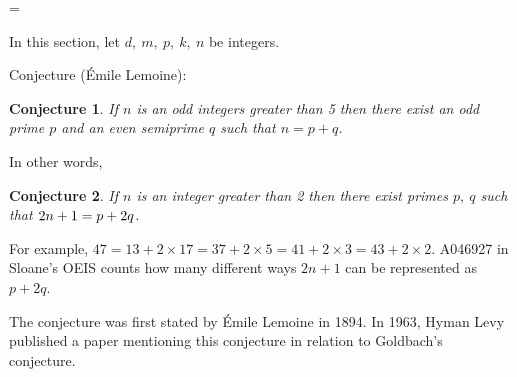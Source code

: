 \documentclass[12pt]{article}
\newtheorem{conjecture}{Conjecture}
\begin{document}
\parskip =\baselineskip
	
	
\begin{cnl}
		
		
\bigskip
		

		
In this section, let $d,\ m,\ p,\ k,\ n$ be integers.
		
		






\begin{remark}
Conjecture (\'Emile Lemoine): 
\end{remark}

\begin{conjecture}
If $n$ is an odd integers greater than 5 then there exist 
an odd prime $p$ and an even semiprime $q$ such that $n=p+q$. 
\end{conjecture}

\begin{remark}
In other words, 
\end{remark}

\begin{conjecture}
If $n$ is an integer greater than 2 then there exist primes 
$p,\ q$ such that $2\*n + 1 = p + 2\*q$. 
\end{conjecture}

\begin{remark}

For example, $47 = 13 + 2 \times 17 = 37 + 2 \times 5 = 
41 + 2 \times 3 = 43 + 2 \times 2$. A046927 in Sloane's OEIS counts
how many different ways $2n + 1$ can be represented as $p + 2q$.

The conjecture was first stated by \'Emile Lemoine in 1894. In 1963, 
Hyman Levy published a paper mentioning this conjecture in relation 
to Goldbach's conjecture.
\end{remark}

\end{cnl}
\end{document}
